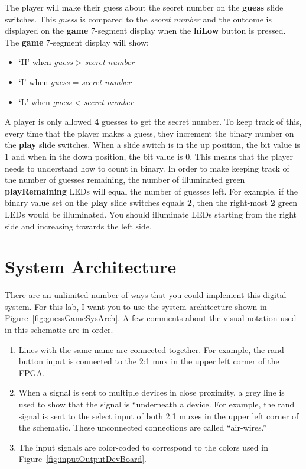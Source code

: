 The player will make their guess about the secret number on the
\textbf{guess} slide switches. This \emph{guess} is compared to the
\emph{secret number} and the outcome is displayed on the \textbf{game}
7-segment display when the \textbf{hiLow} button is pressed. The
\textbf{game} 7-segment display will show:

\begin{itemize}
\item   `H' when \emph{guess} \textgreater{} \emph{secret number}
\item   `I' when \emph{guess} = \emph{secret number}
\item   `L' when \emph{guess} \textless{} \emph{secret number}
\end{itemize}

A player is only allowed \textbf{4} guesses to get the secret number. To
keep track of this, every time that the player makes a guess, they
increment the binary number on the \textbf{play} slide switches. When a
slide switch is in the up position, the bit value is 1 and when in the
down position, the bit value is 0. This means that the player needs to
understand how to count in binary. In order to make keeping track of the
number of guesses remaining, the number of illuminated green
\textbf{playRemaining} LEDs will equal the number of guesses left. For
example, if the binary value set on the \textbf{play} slide switches
equals \textbf{2}, then the right-most \textbf{2} green LEDs would be
illuminated. You should illuminate LEDs starting from the right side and
increasing towards the left side.

\section{System Architecture}

There are an unlimited number of ways that you could implement this
digital system. For this lab, I want you to use the system architecture
shown in Figure~\ref{fig:guessGameSysArch}. A few comments about the visual notation used in this
schematic are in order.

\begin{enumerate}
\def\labelenumi{\arabic{enumi})}
\item
  Lines with the same name are connected together. For example, the rand
  button input is connected to the 2:1 mux in the upper left corner of
  the FPGA.
\item
  When a signal is sent to multiple devices in close proximity, a grey
  line is used to show that the signal is ``underneath a device. For
  example, the rand signal is sent to the select input of both 2:1 muxes
  in the upper left corner of the schematic. These unconnected
  connections are called ``air-wires.''
\item
  The input signals are color-coded to correspond to the colors used in
  Figure~\ref{fig:inputOutputDevBoard}.
\end{enumerate}

